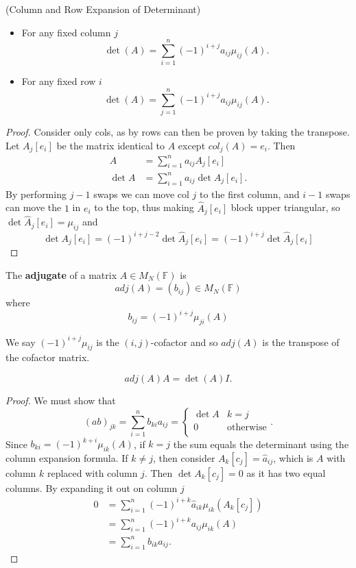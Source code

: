 \begin{prop} (Column and Row Expansion of Determinant)

  \begin{itemize}
    \item For any fixed column $j$
      \[\det(A) = \sum_{i= 1}^n (-1)^{i + j} a_{ij}\mu_{ij}(A).\]
    \item For any fixed row $i$
      \[\det(A) = \sum_{j= 1}^n (-1)^{i + j} a_{ij}\mu_{ij}(A).\]

  \end{itemize}
    
\end{prop}
\begin{proof}
  Consider only cols, as by rows can then be proven by taking the transpose. Let $A_j[e_i]$ be the matrix identical to $A$ except $col_j(A) = e_i$. Then
  \begin{align*}
    A &= \sum_{ i = 1}^{n} a_{ij} A_j[e_i] \\
    \det A &= \sum_{ i = 1}^{n} a_{ij} \det A_j[e_i]
  .\end{align*}
  By performing $j - 1$ swaps we can move col $j$ to the first column, and $i - 1$ swaps can move the $1$ in $e_i$ to the top, thus making $\hat{A}_j[e_i]$ block upper triangular, so $\det \hat{A}_j [e_i] = \mu_{ij}$ and 
  \[\det A_j[e_i] = (-1)^{i + j - 2}\det \hat{A}_j[e_i] = (-1)^{i + j}\det \hat{A}_j[e_i]\]
\end{proof}

\begin{definition}
  The {\bf adjugate} of a matrix $A \in M_N(\mathbb{F})$ is
  \[adj(A) = (b_{ij}) \in M_N(\mathbb{F})\]
where 
\[b_{ij} = (-1)^{i + j} \mu_{ji}(A)\]

We say $(-1)^{i + j} \mu_{ij}$ is the $(i, j)$-cofactor and so $adj(A)$ is the transpose of the cofactor matrix.
\end{definition}

\begin{theorem}
  \[adj(A) A = \det(A) I.\]
\end{theorem}
\begin{proof}
    We must show that
    \[(ab)_{jk} = \sum_{ i = 1}^{n} b_{ki}a_{ij} = \left\{\begin{array}{lr}
    \det A & k = j\\
    0 & \text{otherwise}\\
    \end{array} \right..\]
    Since $b_{ki} = (-1)^{k + i}\mu_{ik}(A)$, if $k = j$ the sum equals the determinant using the column expansion formula. If $k \not = j$, then consider $A_k[c_j] = \hat{a}_{ij}$, which is $A$ with column $k$ replaced with column $j$. Then $\det A_k[c_j] = 0$ as it has two equal columns. By expanding it out on column $j$
    \begin{align*}
      0 &= \sum_{ i = 1}^{n} (-1)^{i + k} \hat{a}_{ik} \mu_{ik}(A_k[c_j]) \\
        &= \sum_{ i = 1}^{n} (-1)^{i + k} a_{ij} \mu_{ik}(A) \\
        &= \sum_{ i = 1}^{n} b_{ik}  a_{ij}
    .\end{align*}
\end{proof}


